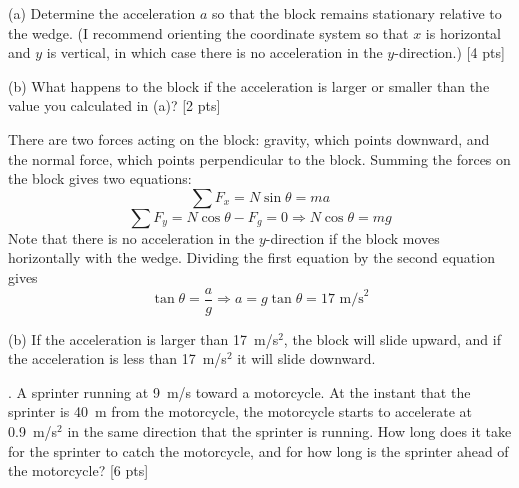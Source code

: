 \documentclass[11pt,letterpaper]{article}
\newcommand{\sol}[1]{{\color{White} #1}} %
\begin{document}
(a) Determine the acceleration $a$ so that the block remains stationary relative to the wedge. (I recommend orienting the coordinate system so that $x$ is horizontal and $y$ is vertical, in which case there is no acceleration in the $y$-direction.) [4 pts]

(b) What happens to the block if the acceleration is larger or smaller than the value you calculated in (a)? [2 pts]

\sol{There are two forces acting on the block: gravity, which points downward, and the normal force, which points perpendicular to the block. Summing the forces on the block gives two equations:
\begin{equation}
\sum F_x = N\sin\theta = ma
\end{equation}
\begin{equation}
\sum F_y = N\cos\theta-F_g = 0 \Rightarrow N\cos\theta = mg
\end{equation}
Note that there is no acceleration in the $y$-direction if the block moves horizontally with the wedge. Dividing the first equation by the second equation gives
\begin{equation}
\tan\theta = \frac{a}{g} \Rightarrow \boxed{a=g\tan\theta = 17\mbox{ m/s}^2}
\end{equation}

(b) If the acceleration is larger than 17~m/s$^2$, the block will slide upward, and if the acceleration is less than 17~m/s$^2$ it will slide downward.

}

. A sprinter running at 9~m/s toward a motorcycle. At the instant that the sprinter is 40~m from the motorcycle, the motorcycle starts to accelerate at 0.9~m/s$^2$ in the same direction that the sprinter is running. How long does it take for the sprinter to catch the motorcycle, and for how long is the sprinter ahead of the motorcycle? [6 pts]
\end{document}
